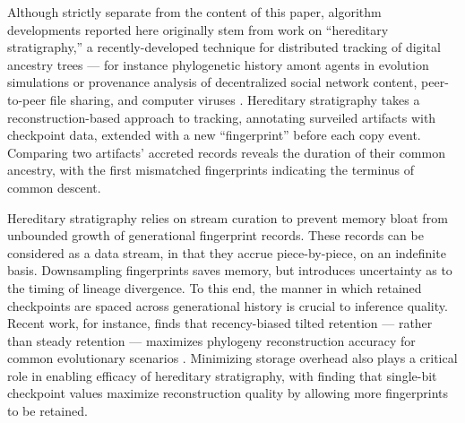 
Although strictly separate from the content of this paper, algorithm developments reported here originally stem from work on ``hereditary stratigraphy,'' a recently-developed technique for distributed tracking of digital ancestry trees --- for instance phylogenetic history amont agents in evolution simulations or provenance analysis of decentralized social network content, peer-to-peer file sharing, and computer viruses \citep{moreno2022hereditary}.
Hereditary stratigraphy takes a reconstruction-based approach to tracking, annotating surveiled artifacts with checkpoint data, extended with a new ``fingerprint'' before each copy event.
Comparing two artifacts' accreted records reveals the duration of their common ancestry, with the first mismatched fingerprints indicating the terminus of common descent.

Hereditary stratigraphy relies on stream curation to prevent memory bloat from unbounded growth of generational fingerprint records.
These records can be considered as a data stream, in that they accrue piece-by-piece, on an indefinite basis.
Downsampling fingerprints saves memory, but introduces uncertainty as to the timing of lineage divergence.
To this end, the manner in which retained checkpoints are spaced across generational history is crucial to inference quality.
Recent work, for instance, finds that recency-biased tilted retention --- rather than steady retention --- maximizes phylogeny reconstruction accuracy for common evolutionary scenarios \citep{moreno2024guide}.
Minimizing storage overhead also plays a critical role in enabling efficacy of hereditary stratigraphy, with \citet{moreno2024guide} finding that single-bit checkpoint values maximize reconstruction quality by allowing more fingerprints to be retained.
